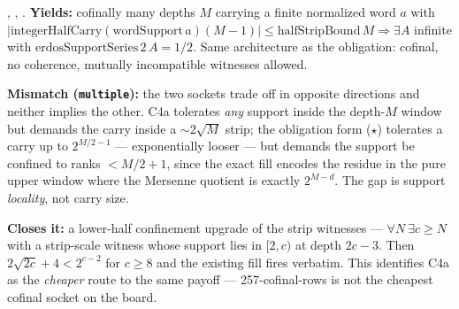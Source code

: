 \begin{obs} 
,
,
.
\textbf{Yields:} cofinally many depths $M$ carrying a finite normalized word $a$ with
$|\mathrm{integerHalfCarry}(\mathrm{wordSupport}\,a)(M{-}1)| \le \mathrm{halfStripBound}\,M
\Rightarrow \exists A$ infinite with $\mathrm{erdosSupportSeries}\,2\,A=1/2$. Same architecture
as the obligation: cofinal, no coherence, mutually incompatible witnesses allowed.

\par\medskip

\textbf{Mismatch (\texttt{multiple}):} the two sockets trade off in opposite directions and
neither implies the other. C4a tolerates \emph{any} support inside the depth-$M$ window but
demands the carry inside a $\sim 2\sqrt M$ strip; the obligation form ($\star$) tolerates a carry
up to $2^{M/2-1}$ — exponentially looser — but demands the support be confined to ranks $<
M/2+1$, since the exact fill encodes the residue in the pure upper window where the Mersenne
quotient is exactly $2^{M-d}$. The gap is support \emph{locality}, not carry size.

\par\medskip

\textbf{Closes it:} a lower-half confinement upgrade of the strip witnesses — $\forall N\
\exists c\ge N$ with a strip-scale witness whose support lies in $[2,c)$ at depth $2c{-}3$. Then
$2\sqrt{2c}+4 < 2^{c-2}$ for $c\ge8$ and the existing fill fires verbatim. This identifies C4a as
the \emph{cheaper} route to the same payoff — 257-cofinal-rows is not the cheapest cofinal socket
on the board.
\end{obs}

